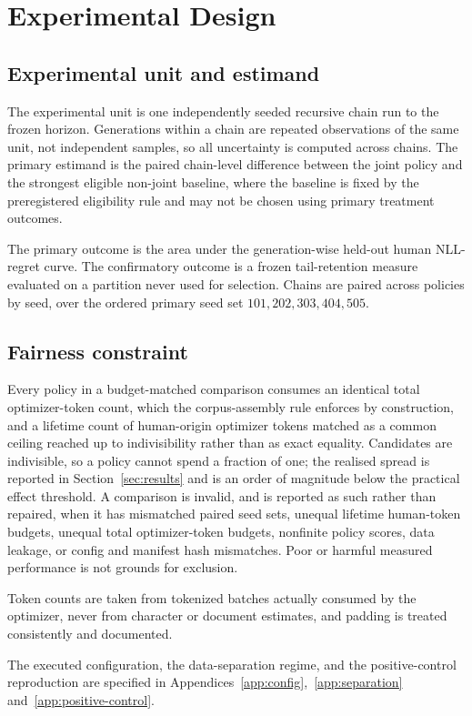 \section{Experimental Design}
\label{sec:experiments}

\subsection{Experimental unit and estimand}

The experimental unit is one independently seeded recursive chain run to the frozen
horizon. Generations within a chain are repeated observations of the same unit, not
independent samples, so all uncertainty is computed across chains. The primary estimand is
the paired chain-level difference between the joint policy and the strongest eligible
non-joint baseline, where the baseline is fixed by the preregistered eligibility rule and
may not be chosen using primary treatment outcomes.

The primary outcome is the area under the generation-wise held-out human NLL-regret curve.
The confirmatory outcome is a frozen tail-retention measure evaluated on a partition never
used for selection. Chains are paired across policies by seed, over the ordered primary
seed set $101, 202, 303, 404, 505$.

\subsection{Fairness constraint}

Every policy in a budget-matched comparison consumes an identical total optimizer-token
count, which the corpus-assembly rule enforces by construction, and a lifetime count of
human-origin optimizer tokens matched as a common ceiling reached up to indivisibility
rather than as exact equality. Candidates are indivisible, so a policy cannot spend a
fraction of one; the realised spread is reported in Section~\ref{sec:results} and is an
order of magnitude below the practical effect threshold. A comparison is
invalid, and is reported as such rather than repaired, when it has mismatched paired seed
sets, unequal lifetime human-token budgets, unequal total optimizer-token budgets,
nonfinite policy scores, data leakage, or config and manifest hash mismatches. Poor or
harmful measured performance is not grounds for exclusion.

Token counts are taken from tokenized batches actually consumed by the optimizer, never
from character or document estimates, and padding is treated consistently and documented.

The executed configuration, the data-separation regime, and the positive-control reproduction are specified in Appendices~\ref{app:config},~\ref{app:separation} and~\ref{app:positive-control}.
